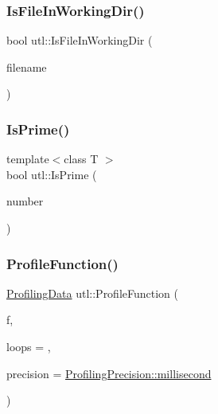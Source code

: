 \mbox{\label{namespaceutl_a4885b4fd5be2d785d8afa24b8dec7a65}} 
\subsubsection{\texorpdfstring{Is\+File\+In\+Working\+Dir()}{IsFileInWorkingDir()}}
{\footnotesize\ttfamily bool utl\+::\+Is\+File\+In\+Working\+Dir (\begin{DoxyParamCaption}\item[{const char $\ast$}]{filename }\end{DoxyParamCaption})}

\mbox{\label{namespaceutl_ad20146756b17b6333c436922702f26b6}} 
\subsubsection{\texorpdfstring{Is\+Prime()}{IsPrime()}}
{\footnotesize\ttfamily template$<$class T $>$ \\
bool utl\+::\+Is\+Prime (\begin{DoxyParamCaption}\item[{T}]{number }\end{DoxyParamCaption})}

\mbox{\label{namespaceutl_a414d8db340d2163b038d367b84747435}} 
\subsubsection{\texorpdfstring{Profile\+Function()}{ProfileFunction()}}
{\footnotesize\ttfamily \mbox{\hyperlink{structutl_1_1_profiling_data}{Profiling\+Data}} utl\+::\+Profile\+Function (\begin{DoxyParamCaption}\item[{std\+::function$<$ void(void)$>$}]{f,  }\item[{const unsigned int}]{loops = {},  }\item[{\mbox{\hyperlink{namespaceutl_ad221bb3fac593651670bdc0263b92707}{Profiling\+Precision}}}]{precision = {\ttfamily \mbox{\hyperlink{namespaceutl_ad221bb3fac593651670bdc0263b92707a407aa8403e413c457b081a9dc095a285}{Profiling\+Precision\+::millisecond}}} }\end{DoxyParamCaption})}

